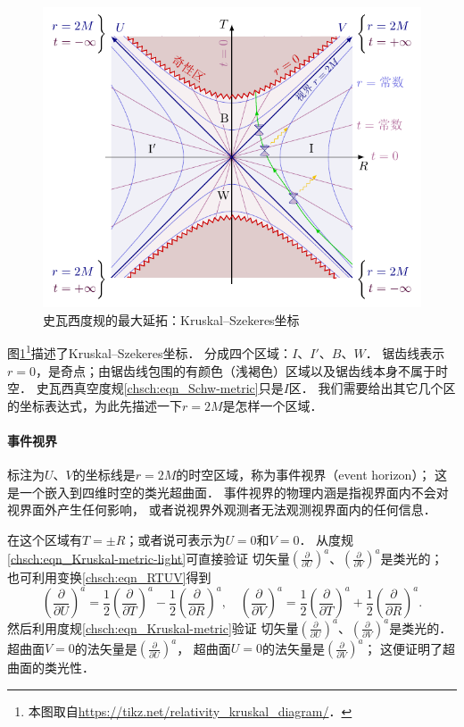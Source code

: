 \begin{figure}[htb]
    \centering
    \includegraphics[width=15cm]{fig/II6-Kruskal.pdf}
    \caption{史瓦西度规的最大延拓：Kruskal--Szekeres坐标} \label{chsch:fig_Kruskal}
\end{figure}







图\ref{chsch:fig_Kruskal}{\footnote{本图取自\url{https://tikz.net/relativity_kruskal_diagram/}．}}描述了Kruskal--Szekeres坐标．
分成四个区域：$I$、$I'$、$B$、$W$．
锯齿线表示$r=0$，是奇点；由锯齿线包围的有颜色（浅褐色）区域以及锯齿线本身不属于时空．
史瓦西真空度规\eqref{chsch:eqn_Schw-metric}只是$I$区．
我们需要给出其它几个区的坐标表达式，为此先描述一下$r=2M$是怎样一个区域．

\paragraph{事件视界}\label{chsch:sec_event-horizon}
标注为$U$、$V$的坐标线是$r=2M$的时空区域，称为{\heiti 事件视界}（event horizon）；
这是一个嵌入到四维时空的类光超曲面．
事件视界的物理内涵是指视界面内不会对视界面外产生任何影响，
或者说视界外观测者无法观测视界面内的任何信息．

在这个区域有$T=\pm R$；或者说可表示为$U=0$和$V=0$．
从度规\eqref{chsch:eqn_Kruskal-metric-light}可直接验证
切矢量$(\frac{\partial}{\partial U})^a$、$(\frac{\partial}{\partial V})^a$是类光的；
也可利用变换\eqref{chsch:eqn_RTUV}得到
\begin{equation*}
    \left(\frac{\partial}{\partial U}\right)^a = 
    \frac{1}{2} \left(\frac{\partial}{\partial T}\right)^a-
    \frac{1}{2} \left(\frac{\partial}{\partial R}\right)^a,\quad
    \left(\frac{\partial}{\partial V}\right)^a = 
    \frac{1}{2} \left(\frac{\partial}{\partial T}\right)^a+
    \frac{1}{2} \left(\frac{\partial}{\partial R}\right)^a.
\end{equation*}
然后利用度规\eqref{chsch:eqn_Kruskal-metric}验证
切矢量$(\frac{\partial}{\partial U})^a$、$(\frac{\partial}{\partial V})^a$是类光的．
超曲面$V=0$的法矢量是$(\frac{\partial}{\partial U})^a$，
超曲面$U=0$的法矢量是$(\frac{\partial}{\partial V})^a$；
这便证明了超曲面的类光性．

